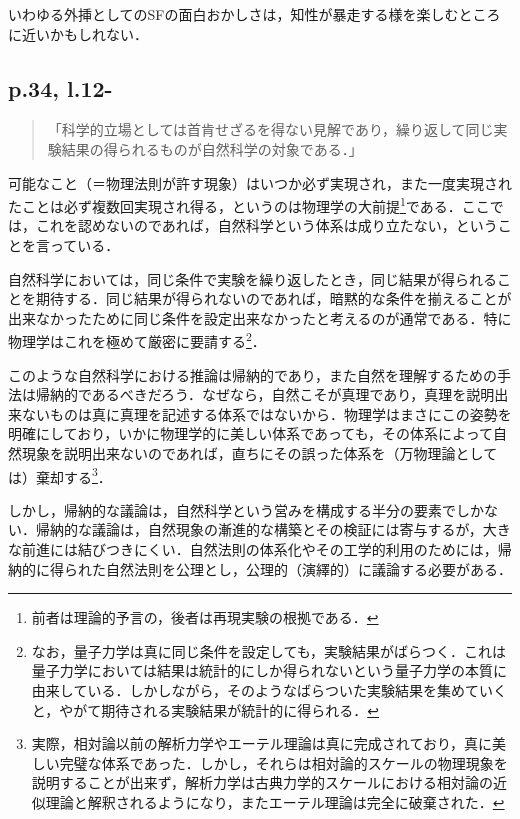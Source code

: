 \documentclass[10pt, a5paper, twoside]{jsarticle}
\theoremstyle{definition}
\begin{document}
                いわゆる外挿としてのSFの面白おかしさは，知性が暴走する様を楽しむところに近いかもしれない．

            \subsection{p.34, l.12-}

                \begin{quote}

                    「科学的立場としては首肯せざるを得ない見解であり，繰り返して同じ実験結果の得られるものが自然科学の対象である．」

                \end{quote}

                可能なこと（＝物理法則が許す現象）はいつか必ず実現され，また一度実現されたことは必ず複数回実現され得る，というのは物理学の大前提\footnote{前者は理論的予言の，後者は再現実験の根拠である．}である．ここでは，これを認めないのであれば，自然科学という体系は成り立たない，ということを言っている．

                自然科学においては，同じ条件で実験を繰り返したとき，同じ結果が得られることを期待する．同じ結果が得られないのであれば，暗黙的な条件を揃えることが出来なかったために同じ条件を設定出来なかったと考えるのが通常である．特に物理学はこれを極めて厳密に要請する\footnote{なお，量子力学は真に同じ条件を設定しても，実験結果がばらつく．これは量子力学においては結果は統計的にしか得られないという量子力学の本質に由来している．しかしながら，そのようなばらついた実験結果を集めていくと，やがて期待される実験結果が統計的に得られる．}．

                このような自然科学における推論は帰納的であり，また自然を理解するための手法は帰納的であるべきだろう．なぜなら，自然こそが真理であり，真理を説明出来ないものは真に真理を記述する体系ではないから．物理学はまさにこの姿勢を明確にしており，いかに物理学的に美しい体系であっても，その体系によって自然現象を説明出来ないのであれば，直ちにその誤った体系を（万物理論としては）棄却する\footnote{実際，相対論以前の解析力学やエーテル理論は真に完成されており，真に美しい完璧な体系であった．しかし，それらは相対論的スケールの物理現象を説明することが出来ず，解析力学は古典力学的スケールにおける相対論の近似理論と解釈されるようになり，またエーテル理論は完全に破棄された．}．

                しかし，帰納的な議論は，自然科学という営みを構成する半分の要素でしかない．帰納的な議論は，自然現象の漸進的な構築とその検証には寄与するが，大きな前進には結びつきにくい．自然法則の体系化やその工学的利用のためには，帰納的に得られた自然法則を公理とし，公理的（演繹的）に議論する必要がある．
\end{document}
